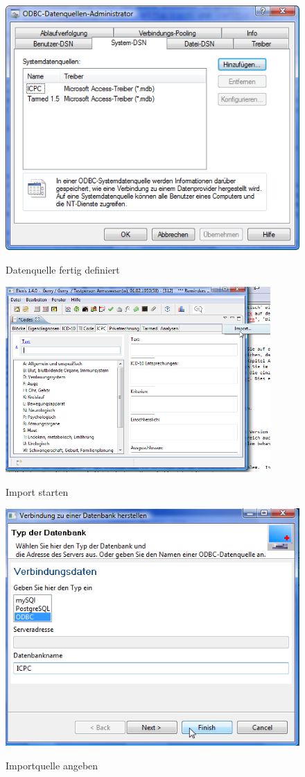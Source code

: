 \documentclass[a4paper]{scrartcl}
\begin{document}
\begin{figure}
  \includegraphics{icpc9}\\
  \caption{Datenquelle fertig definiert}\label{fig:odbc5}
\end{figure}

\begin{figure}
  \includegraphics[width=0.9\textwidth]{icpc10}\\
  \caption{Import starten}\label{fig:import1}
\end{figure}

\begin{figure}
  \includegraphics{icpc11}\\
  \caption{Importquelle angeben}\label{fig:import2}
\end{figure}
\end{document}
